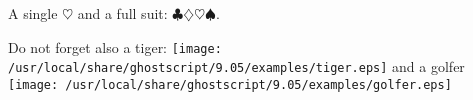 \documentclass {article}
\begin{document}
A {\color{green}single $\heartsuit$} and a {\color{red}full
suit: \( \clubsuit \diamondsuit
\heartsuit \spadesuit \)}.

\noindent Do not forget also a tiger:
\texttt{[image: /usr/local/share/ghostscript/9.05/examples/tiger.eps]}
and a golfer
\texttt{[image: /usr/local/share/ghostscript/9.05/examples/golfer.eps]}
\end{document}
